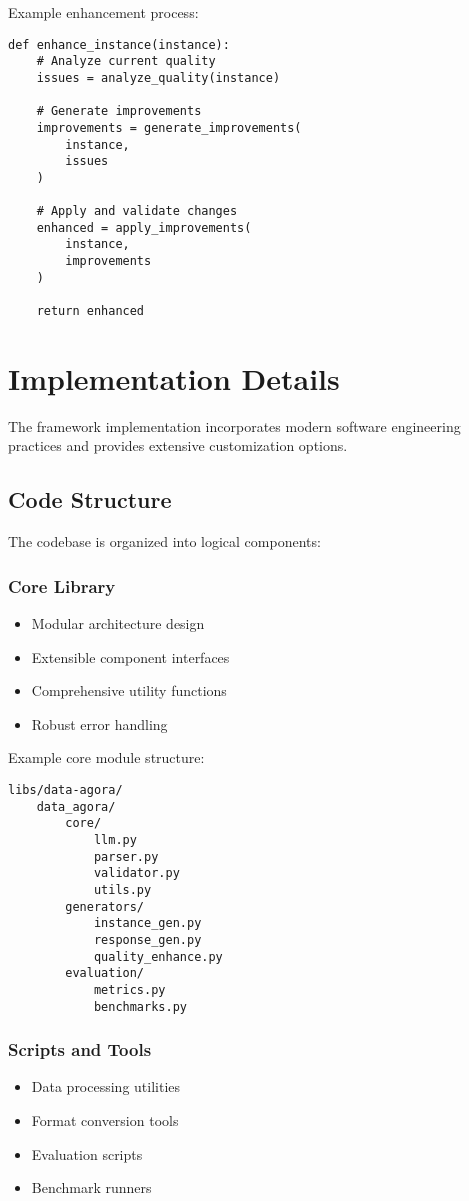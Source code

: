 \documentclass[10pt,conference]{IEEEtran}
\begin{document}
Example enhancement process:
\begin{lstlisting}
def enhance_instance(instance):
    # Analyze current quality
    issues = analyze_quality(instance)
    
    # Generate improvements
    improvements = generate_improvements(
        instance,
        issues
    )
    
    # Apply and validate changes
    enhanced = apply_improvements(
        instance,
        improvements
    )
    
    return enhanced
\end{lstlisting}

\section{Implementation Details}
The framework implementation incorporates modern software engineering practices and provides extensive customization options.

\subsection{Code Structure}
The codebase is organized into logical components:

\subsubsection{Core Library}
\begin{itemize}
    \item Modular architecture design
    \item Extensible component interfaces
    \item Comprehensive utility functions
    \item Robust error handling
\end{itemize}

Example core module structure:
\begin{lstlisting}
libs/data-agora/
    data_agora/
        core/
            llm.py
            parser.py
            validator.py
            utils.py
        generators/
            instance_gen.py
            response_gen.py
            quality_enhance.py
        evaluation/
            metrics.py
            benchmarks.py
\end{lstlisting}

\subsubsection{Scripts and Tools}
\begin{itemize}
    \item Data processing utilities
    \item Format conversion tools
    \item Evaluation scripts
    \item Benchmark runners
\end{itemize}
\end{document}
